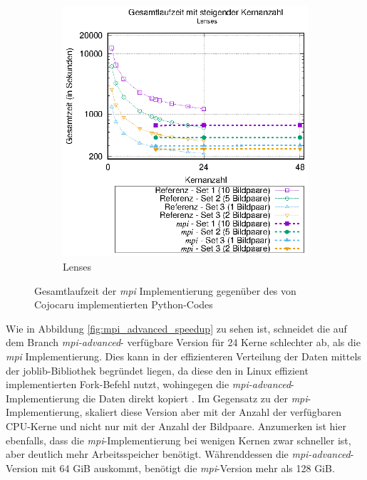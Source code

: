 \begin{center}
\begin{figure}[htbp]
\begin{subfigure}[b]{0.45\textwidth}
			\includegraphics[width=\textwidth]{pdf/mpi_times_lenses}
			\caption{Lenses}
			\label{fig:mpi_times_lenses}
		\end{subfigure}
		\caption{Gesamtlaufzeit der \textit{mpi} Implementierung gegenüber des von Cojocaru implementierten Python-Codes}
		\label{fig:mpi_times}
	\end{figure}
\end{center}

Wie in Abbildung \ref{fig:mpi_advanced_speedup} zu sehen ist, schneidet die auf dem Branch \textit{mpi-advanced}-\cite{CBS18} verfügbare Version für 24 Kerne schlechter ab, als die \textit{mpi} Implementierung. Dies kann in der effizienteren Verteilung der Daten mittels der joblib-Bibliothek begründet liegen, da diese den in Linux effizient implementierten Fork-Befehl nutzt, wohingegen die \textit{mpi-advanced}-Implementierung die Daten direkt kopiert \cite{GVB+18}. Im Gegensatz zu der \textit{mpi}-Implementierung, skaliert diese Version aber mit der Anzahl der verfügbaren \gls{CPU}-Kerne und nicht nur mit der Anzahl der Bildpaare. Anzumerken ist hier ebenfalls, dass die \textit{mpi}-Implementierung bei wenigen Kernen zwar schneller ist, aber deutlich mehr Arbeitsspeicher benötigt. Währenddessen die \textit{mpi-advanced}-Version mit 64 \gls{GiB} auskommt, benötigt die \textit{mpi}-Version mehr als 128 \gls{GiB}.

